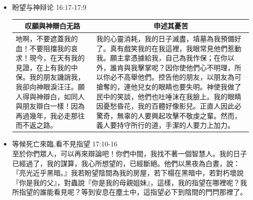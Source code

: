 \begin{itemize}
\item 盼望与神辩论 16:17-17:9 
\begin{table}[H]
\centering 
\begin{tabular}{p{15.5em}|p{34.5em}}    \toprule
\multicolumn{1}{c|}{叹願與神辯白无路}&\multicolumn{1}{c}{申述其憂苦}\\\hline
地啊，不要遮蓋我的血！不要阻擋我的哀求！現今，在天有我的見證，在上有我的中保。我的朋友譏誚我，我卻向神眼淚汪汪。願人得與神辯白，如同人與朋友辯白一樣！因為再過幾年，我必走那往而不返之路。
&我的心靈消耗，我的日子滅盡，墳墓為我預備好了。真有戲笑我的在我這裡，我眼常見他們惹動我。願主拿憑據給我，自己為我作保；在你以外，誰肯與我擊掌呢？因你使他們心不明理，所以你必不高舉他們。控告他的朋友，以朋友為可搶奪的，連他兒女的眼睛也要失明。神使我做了民中的笑談，他們也吐唾沫在我臉上。我的眼睛因憂愁昏花，我的百體好像影兒。正直人因此必驚奇，無辜的人要興起攻擊不敬虔之輩。然而，義人要持守所行的道，手潔的人要力上加力。\\ \bottomrule
\end{tabular} 
\end{table}
\item 等候死亡來臨,看不見指望 17:10-16 \\
至於你們眾人，可以再來辯論吧！你們中間，我找不著一個智慧人。我的日子已經過了，我的謀算，我心所想望的，已經斷絕。他們以黑夜為白晝，說：『亮光近乎黑暗。』我若盼望陰間為我的房屋，若下榻在黑暗中，若對朽壞說『你是我的父』，對蟲說『你是我的母親姐妹』，這樣，我的指望在哪裡呢？我所指望的誰能看見呢？等到安息在塵土中，這指望必下到陰間的門閂那裡了。
\end{itemize}

